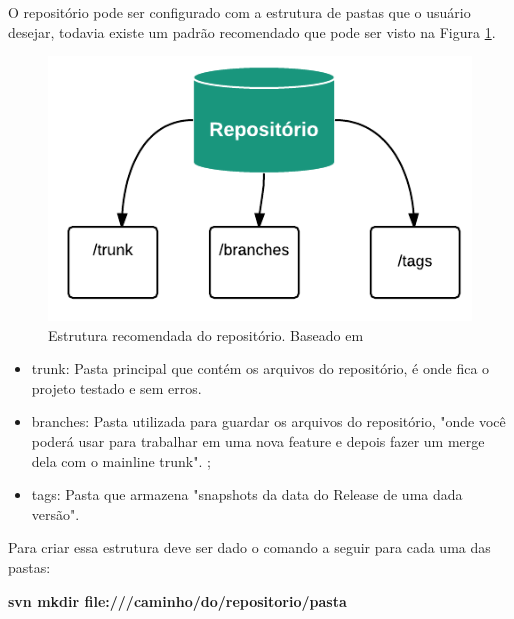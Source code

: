 O repositório pode ser configurado com a estrutura de pastas que o usuário desejar, todavia existe um padrão recomendado que pode ser visto na Figura 
\ref{estrutura_repo}.

\begin{figure}[!htb]
\label{estrutura_repo}
\centering
\includegraphics[scale=1]{figuras/estrutura_repo.png}
\caption{Estrutura recomendada do repositório. Baseado em \cite{svn-book}}
\end{figure}

\begin{itemize}
  \item trunk: Pasta principal que contém os arquivos do repositório, é onde fica o projeto testado e sem erros. \cite{wiki-svn}

  \item branches: Pasta utilizada para guardar os arquivos do repositório, "onde você poderá usar para trabalhar em uma nova feature e depois fazer um merge dela com o mainline trunk". \cite{wiki-svn};

  \item tags: Pasta que armazena "snapshots da data do Release de uma dada versão". \cite{wiki-svn}
\end{itemize}

Para criar essa estrutura deve ser dado o comando a seguir para cada uma das pastas: \cite{wiki-svn}

\begin{centering}

\colorbox{PineGreen}{
\begin{minipage}{220px}
  \textbf{svn mkdir file:///caminho/do/repositorio/pasta}
\end{minipage}
}

\end{centering}

